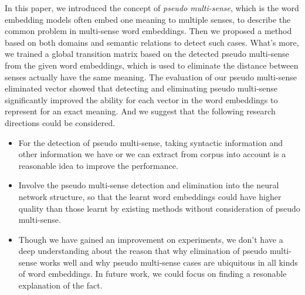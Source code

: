 \documentclass[11pt]{article}
\begin{document}
\par
In this paper, we introduced the concept of {\sl pseudo multi-sense}, which is the word embedding models often embed one meaning to multiple senses, to describe the common problem in multi-sense word embeddings. Then we proposed a method based on both domains and semantic relations to detect such cases. What's more, we trained a global transition matrix based on the detected pseudo multi-sense from the given word embeddings, which is used to eliminate the distance between senses actually have the same meaning. The evaluation of our pseudo multi-sense eliminated vector showed that detecting and eliminating pseudo multi-sense significantly improved the ability for each vector in the word embeddings to represent for an exact meaning. And we suggest that the following research directions could be considered.%
\begin{itemize}
\item For the detection of pseudo multi-sense, taking syntactic information and other information we have or we can extract from corpus into account is a reasonable idea to improve the performance.
\item Involve the pseudo multi-sense detection and elimination into the neural network structure, so that the learnt word embeddings could have higher quality than those learnt by existing methods without consideration of pseudo multi-sense.
\item Though we have gained an improvement on experiments, we don't have a deep understanding about the reason that why elimination of pseudo multi-sense works well and why pseudo multi-sense cases are ubiquitous in all kinds of word embeddings. In future work, we could focus on finding a resonable explanation of the fact.
\end{itemize}


\newpage

\end{document}
